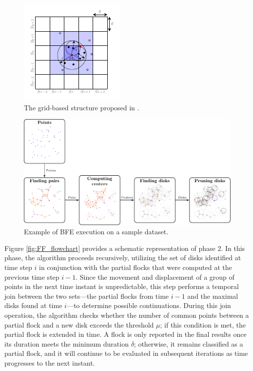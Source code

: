 \begin{figure}
    \centering
    \includegraphics[width=0.5\linewidth]{chapter4/figures/grid_prime}
    \caption{The grid-based structure proposed in \cite{vieira_2009}.}\label{fig:grid}
\end{figure}

\begin{figure}
    \centering
    \includegraphics[width=\linewidth]{chapter4/figures/MF_stages2/flow}
    \caption{Example of BFE execution on a sample dataset.}\label{fig:MF_stages}
\end{figure}

Figure \ref{fig:FF_flowchart} provides a schematic representation of phase 2. In this phase, the algorithm proceeds recursively, utilizing the set of disks identified at time step $i$ in conjunction with the partial flocks that were computed at the previous time step $i-1$. Since the movement and displacement of a group of points in the next time instant is unpredictable, this step performs a temporal join between the two sets—the partial flocks from time $i-1$ and the maximal disks found at time $i$—to determine possible continuations. During this join operation, the algorithm checks whether the number of common points between a partial flock and a new disk exceeds the threshold $\mu$; if this condition is met, the partial flock is extended in time. A flock is only reported in the final results once its duration meets the minimum duration $\delta$; otherwise, it remains classified as a partial flock, and it will continue to be evaluated in subsequent iterations as time progresses to the next instant.

